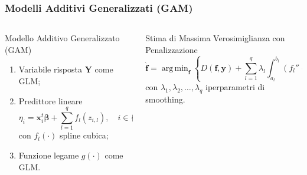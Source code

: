 \documentclass[pdf, aspectratio=169, xcolor=dvipsnames]{beamer}\usepackage[]{graphicx}\usepackage[]{color}
\DeclareMathOperator*{\argmin}{arg\,min}  %
\theoremstyle{definition}
\begin{document}
\begin{frame}
\frametitle{Modelli Additivi Generalizzati (GAM)}

\fontsize{9pt}{11pt}\selectfont

\begin{columns}[T]
\begin{column}{0.5\linewidth}
  \begin{block}{Modello Additivo Generalizzato (GAM)}
    \begin{enumerate}
      \item Variabile risposta $\boldsymbol{Y}$ come GLM;
      \item Predittore lineare
      $$
      \eta_i = \boldsymbol{x}_i^t \boldsymbol{\beta} + \sum_{l=1}^{q}{f_l(z_{i,l})}, \quad i\in\{1,2,\dots,n\}
      $$
      con $f_l(\cdot)$ spline cubica;
      \item Funzione legame $g(\cdot)$ come GLM.
    \end{enumerate}
  \end{block}
\end{column}

\begin{column}{0.5\linewidth}
  \begin{block}{Stima di Massima Verosimiglianza con Penalizzazione}
    $$
    \boldsymbol{\hat{f}} = \argmin_{\boldsymbol{f}}
    {\left\{
      D(\boldsymbol{f}, \boldsymbol{y})
        + \sum_{l=1}^{q}{
          \lambda_l \int_{a_l}^{b_l}{\left( f_l''(x_l) \right)^2 dx}
        }
    \right\}
    }
    $$
    con $\lambda_1, \lambda_2, \dots, \lambda_q$ iperparametri di smoothing.
  \end{block}
\end{column}

\end{columns}

\end{frame}
\end{document}
